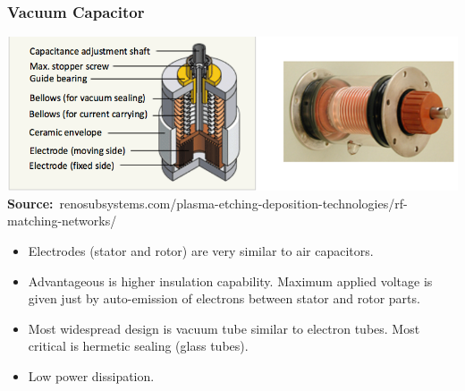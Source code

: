\documentclass{beamer}
\begin{document}
	\begin{frame}
    \frametitle{Vacuum Capacitor}
		\begin{center}
			\includegraphics[scale=0.38]{obr03_vakuovyKond.png}\\
			
			\tiny{\textbf{Source:}~renosubsystems.com/plasma-etching-deposition-technologies/rf-matching-networks/}
		\end{center}
		\small
		
		\begin{itemize}
			\item Electrodes (stator and rotor) are very similar to air capacitors.
			\item Advantageous is higher insulation capability. Maximum applied voltage is given just by auto-emission of electrons between stator and rotor parts.
			\item Most widespread design is vacuum tube similar to electron tubes.  Most critical is hermetic sealing (glass tubes).
			\item Low power dissipation.
		\end{itemize}
  \end{frame}
\end{document}
